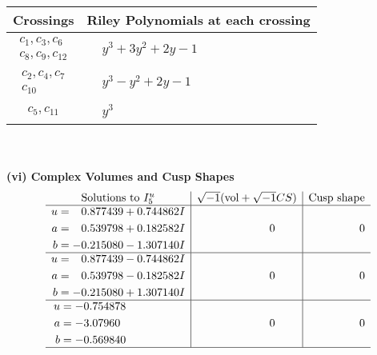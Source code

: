 \documentclass[1p]{elsarticle_modified}
\theoremstyle{definition}
\newcommand{\I}{\sqrt{-1}}
\begin{document}
\begin{tabular}{m{50pt}|m{274pt}}
Crossings & \hspace{64pt}Riley Polynomials at each crossing \\
\hline $$\begin{aligned}c_{1},c_{3},c_{6}\\c_{8},c_{9},c_{12}\end{aligned}$$&$\begin{aligned}
&y^3+3 y^2+2 y-1
\end{aligned}$\\
\hline $$\begin{aligned}c_{2},c_{4},c_{7}\\c_{10}\end{aligned}$$&$\begin{aligned}
&y^3- y^2+2 y-1
\end{aligned}$\\
\hline $$\begin{aligned}c_{5},c_{11}\end{aligned}$$&$\begin{aligned}
&y^3
\end{aligned}$\\
\hline
\end{tabular}\\~\\
\newpage\flushleft \textbf{(vi) Complex Volumes and Cusp Shapes}
$$\begin{array}{c|c|c}  
\text{Solutions to }I^u_{5}& \I (\text{vol} + \sqrt{-1}CS) & \text{Cusp shape}\\
 \hline 
\begin{aligned}
u &= \phantom{-}0.877439 + 0.744862 I \\
a &= \phantom{-}0.539798 + 0.182582 I \\
b &= -0.215080 - 1.307140 I\end{aligned}
 & \phantom{-0.000000 } 0 & \phantom{-0.000000 } 0 \\ \hline\begin{aligned}
u &= \phantom{-}0.877439 - 0.744862 I \\
a &= \phantom{-}0.539798 - 0.182582 I \\
b &= -0.215080 + 1.307140 I\end{aligned}
 & \phantom{-0.000000 } 0 & \phantom{-0.000000 } 0 \\ \hline\begin{aligned}
u &= -0.754878\phantom{ +0.000000I} \\
a &= -3.07960\phantom{ +0.000000I} \\
b &= -0.569840\phantom{ +0.000000I}\end{aligned}
 & \phantom{-0.000000 } 0 & \phantom{-0.000000 } 0\\
 \hline 
 \end{array}$$\newpage
\end{document}
